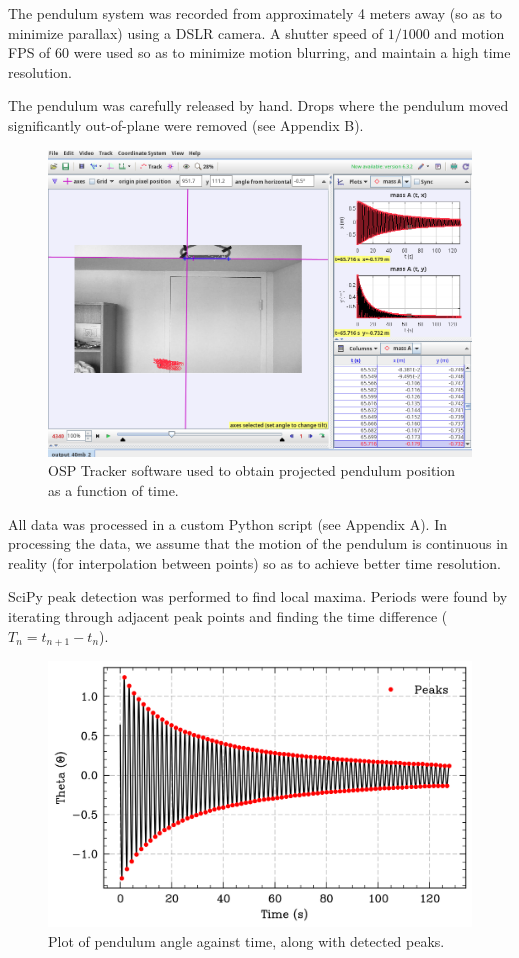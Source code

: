 \documentclass[prl,twocolumn,amsmath,amssymb,superscriptaddress]{revtex4-2}
\begin{document}
\newpage

The pendulum system was recorded from approximately 4 meters away (so as to minimize parallax) using a DSLR camera. A shutter speed of $1/1000$ and motion FPS of $60$ were used so as to minimize motion blurring, and maintain a high time resolution.

The pendulum was carefully released by hand. Drops where the pendulum moved significantly out-of-plane were removed (see Appendix B).



\begin{figure}[htb]
    \includegraphics[width=0.7\linewidth]{tracker.png}
    \caption{OSP Tracker software used to obtain projected pendulum position as a function of time.}
    \label{fig:tracker}
\end{figure}

All data was processed in a custom Python script (see Appendix A). In processing the data, we assume that the motion of the pendulum is continuous in reality (for interpolation between points) so as to achieve better time resolution.

SciPy peak detection was performed to find local maxima. Periods were found by iterating through adjacent peak points and finding the time difference ($T_n=t_{n+1}-t_{n}$).

\begin{figure}[htb]
    \includegraphics[width=0.8\linewidth]{angle_time.png}
    \caption{Plot of pendulum angle against time, along with detected peaks.}
    \label{fig:angle_time}
\end{figure}
\end{document}
